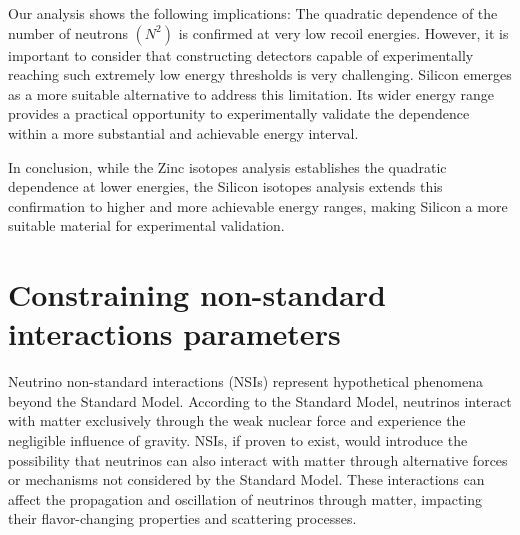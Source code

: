 Our analysis shows the following implications: The quadratic dependence of the number of neutrons $(N^2)$ is confirmed at very low recoil energies. However, it is important to consider that constructing detectors capable of experimentally reaching such extremely low energy thresholds is very challenging. Silicon emerges as a more suitable alternative to address this limitation. Its wider energy range provides a practical opportunity to experimentally validate the dependence within a more substantial and achievable energy interval.

In conclusion, while the Zinc isotopes analysis establishes the quadratic dependence at lower energies, the Silicon isotopes analysis extends this confirmation to higher and more achievable energy ranges, making Silicon a more suitable material for experimental validation.


\section{Constraining non-standard interactions parameters}

Neutrino non-standard interactions (NSIs) represent hypothetical phenomena beyond the Standard Model. According to the Standard Model, neutrinos interact with matter exclusively through the weak nuclear force and experience the negligible influence of gravity. NSIs, if proven to exist, would introduce the possibility that neutrinos can also interact with matter through alternative forces or mechanisms not considered by the Standard Model. These interactions can affect the propagation and oscillation of neutrinos through matter, impacting their flavor-changing properties and scattering processes.

